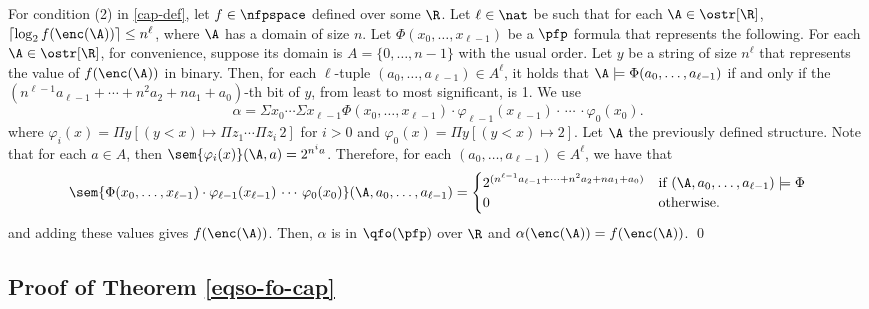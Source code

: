 For condition (2) in \ref{cap-def}, let $f\in \nfpspace$ defined over some $\R$. Let $\ell\in\nat$ be such that for each $\A\in\ostr[\R]$, $\lceil\log_2 f(\enc(\A)) \rceil \leq n^\ell$, where $\A$ has a domain of size $n$. Let $\Phi(x_0,\ldots,x_{\ell-1})$ be a $\pfp$ formula that represents the following. For each $\A \in \ostr[\R]$, for convenience, suppose its domain is $A = \{0,\ldots,n-1\}$ with the usual order. Let $y$ be a string of size $n^{\ell}$ that represents the value of $f(\enc(\A))$ in binary. Then, for each $\ell$-tuple $(a_0,\ldots,a_{\ell-1}) \in A^{\ell}$, it holds that $\A \models \Phi(a_0,\ldots,a_{\ell-1})$ if and only if the $(n^{\ell-1}a_{\ell-1} + \cdots + n^2 a_2 + n a_1 + a_0)$-th bit of $y$, from least to most significant, is 1. We use
$$
\alpha = \Sigma x_0 \cdots \Sigma x_{\ell-1} \Phi(x_0,\ldots,x_{\ell-1})\cdot\varphi_{\ell-1}(x_{\ell-1})\cdot\,\cdots\,\cdot\varphi_0(x_0).
$$
where $\varphi_i(x) = \Pi y[(y < x)\mapsto\Pi z_1\cdots\Pi z_i\,2]$ for $i > 0$ and $\varphi_0(x) = \Pi y[(y < x)\mapsto 2]$. Let $\A$ the previously defined structure. Note that for each $a\in A$, then $\sem{\varphi_i(x)}(\A,a) = 2^{n^i a}$. Therefore, for each $(a_0,\ldots,a_{\ell-1})\in A^\ell$, we have that
$$
\sem{\Phi(x_0,\ldots,x_{\ell-1})\cdot\varphi_{\ell-1}(x_{\ell-1})\,\cdots\,\varphi_0(x_0)}(\A,a_0,\ldots,a_{\ell-1}) = 
\begin{cases}
2^{(n^{\ell-1}a_{\ell-1} + \cdots + n^2 a_2 + n a_1 + a_0)} &\text{if } (\A,a_0,\ldots,a_{\ell-1})\models\Phi \\
0 &\text{otherwise.}
\end{cases}
$$
and adding these values gives $f(\enc(\A))$. Then, $\alpha$ is in $\qfo(\pfp)$ over $\R$ and $\alpha(\enc(\A)) = f(\enc(\A))$. \qed

\subsection*{Proof of Theorem \ref{eqso-fo-cap}}

